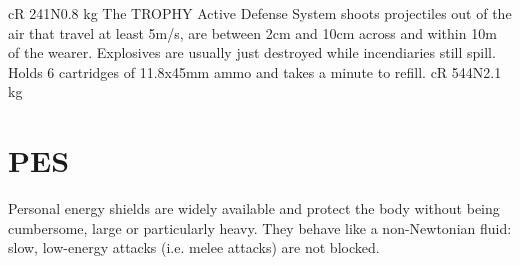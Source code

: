 \begin{multicols}{2}
{	}{cR 24}{1}{N}{0.8 kg}
	{The TROPHY Active Defense System shoots projectiles out of the air that
	travel at least 5m/s,
	are between 2cm and 10cm across
	and within 10m of the wearer.
	Explosives are usually just destroyed while incendiaries still spill.
	Holds 6 cartridges of 11.8x45mm ammo and takes a minute to refill.}
	{cR 54}{4}{N}{2.1 kg}
\end{multicols}

\section{PES}
Personal energy shields are widely available
	and protect the body without being cumbersome,
	large or particularly heavy.
They behave like a non-Newtonian fluid:
	slow, low-energy attacks (i.e. melee attacks) are not blocked.
\par%
\vspace*{3mm}
\begin{multicols}{2}
\end{multicols}
